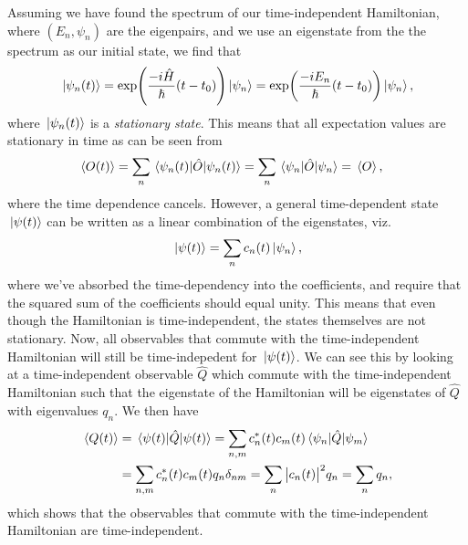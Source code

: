         Assuming we have found the spectrum of our time-independent Hamiltonian,
        where $(E_n, \psi_n)$ are the eigenpairs, and we use an eigenstate from
        the the spectrum as our initial state, we find that
        \begin{gather}
            \ket*{\psi_n(t)}
            = \exp(\frac{-i\hat{H}}{\hslash}(t - t_0))\ket*{\psi_n}
            = \exp(\frac{-i E_n}{\hslash} (t - t_0))\ket*{\psi_n},
        \end{gather}
        where $\ket*{\psi_n(t)}$ is a \emph{stationary state}.
        This means that all expectation values are stationary in time as can be
        seen from
        \begin{align}
            \expval*{O(t)}
            &= \sum_{n}\mel*{\psi_n(t)}{\hat{O}}{\psi_n(t)}
            = \sum_{n}\mel*{\psi_n}{\hat{O}}{\psi_n}
            = \expval*{O},
        \end{align}
        where the time dependence cancels.
        However, a general time-dependent state $\ket*{\psi(t)}$ can be written
        as a linear combination of the eigenstates, viz.
        \begin{align}
            \ket*{\psi(t)} = \sum_{n}c_n(t)\ket*{\psi_n},
        \end{align}
        where we've absorbed the time-dependency into the coefficients, and
        require that the squared sum of the coefficients should equal unity.
        This means that even though the Hamiltonian is time-independent, the
        states themselves are not stationary.
        Now, all observables that commute with the time-independent Hamiltonian
        will still be time-indepedent for $\ket*{\psi(t)}$.
        We can see this by looking at a time-independent observable $\hat{Q}$
        which commute with the time-independent Hamiltonian such that the
        eigenstate of the Hamiltonian will be eigenstates of $\hat{Q}$ with
        eigenvalues $q_n$.
        We then have
        \begin{align}
            \expval*{Q(t)}
            &= \mel*{\psi(t)}{\hat{Q}}{\psi(t)}
            = \sum_{n, m} c^{*}_n(t) c_m(t)
            \mel*{\psi_n}{\hat{Q}}{\psi_m}
            \\
            &= \sum_{n, m}
            c^{*}_n(t) c_m(t) q_n \delta_{nm}
            = \sum_{n}
            \abs{c_n(t)}^2 q_n
            = \sum_{n}
            q_n,
        \end{align}
        which shows that the observables that commute with the time-independent
        Hamiltonian are time-independent.


